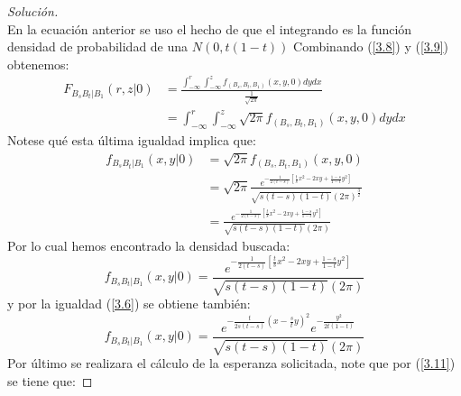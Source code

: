 \documentclass[11pt,notitlepage]{article}
\newenvironment{solucion}
  {\begin{proof}[Solución]}
  {\end{proof}}
\begin{document}
\begin{solucion}
\begin{equation*}
\end{equation*}
En la ecuación anterior se uso el hecho de que el integrando es la función densidad de probabilidad de una \(N(0,t(1-t))\)
Combinando (\ref{3.8}) y (\ref{3.9}) obtenemos: 
\begin{align*}
     F_{B_sB_t|B_1}(r,z|0) &= \frac{\int_{-\infty}^{r}\int_{-\infty}^{z}
                       f_{(B_s,B_t,B_1)}(x,y,0)dydx}{\frac{1}{\sqrt{2\pi}}}\\
                           &=\int_{-\infty}^{r}\int_{-\infty}^{z}\sqrt{2\pi}f_{(B_s,B_t,B_1)}(x,y,0)dydx
\end{align*}
Notese qué esta última igualdad implica que: 
\begin{align*}
    f_{B_sB_t|B_1}(x,y|0) &= \sqrt{2\pi}f_{(B_s,B_t,B_1)}(x,y,0)\\
                          &=  \sqrt{2\pi}\frac{e^{-\frac{1}{2(t-s)}\left[\frac{t}{s}x^2 - 2xy   + \frac{1-s}{1-t}y^2 \right]}}{\sqrt{s(t-s)(1-t)}(2\pi)^{\frac{3}{2}}}\\
                          &= \frac{e^{-\frac{1}{2(t-s)}\left[\frac{t}{s}x^2 - 2xy   + \frac{1-s}{1-t}y^2 \right]}}{\sqrt{s(t-s)(1-t)}(2\pi)}
\end{align*}
Por lo cual hemos encontrado la densidad buscada: 
\begin{equation}\label{3.10}
    f_{B_sB_t|B_1}(x,y|0) = \frac{e^{-\frac{1}{2(t-s)}\left[\frac{t}{s}x^2 - 2xy   + \frac{1-s}{1-t}y^2 \right]}}{\sqrt{s(t-s)(1-t)}(2\pi)}
\end{equation}
y por la igualdad (\ref{3.6}) se obtiene también: 
\begin{equation}\label{3.11}
    f_{B_sB_t|B_1}(x,y|0) = \frac{e^{-\frac{t}{2s(t-s)}\left(x -  \frac{s}{t}y\right)^2}e^{-\frac{y^2}{2t(1-t)}}}{\sqrt{s(t-s)(1-t)}(2\pi)}
\end{equation}
Por último se realizara el cálculo de la esperanza solicitada, note que por (\ref{3.11}) se tiene que: 


\end{solucion}
\end{document}
